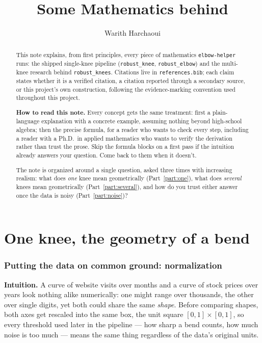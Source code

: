 \documentclass[11pt]{article}
\title{Some Mathematics behind \code{elbow-helper}}
\author{Warith Harchaoui}
\date{}
\newcommand{\code}[1]{\texttt{#1}}
\begin{document}
\maketitle

\begin{abstract}
This note explains, from first principles, every piece of mathematics
\code{elbow-helper} runs: the shipped single-knee pipeline
(\code{robust\_knee}, \code{robust\_elbow}) and the multi-knee research
behind \code{robust\_knees}. Citations live in \code{references.bib}; each
claim states whether it is a verified citation, a citation reported through
a secondary source, or this project's own construction, following the
evidence-marking convention used throughout this project.

\textbf{How to read this note.} Every concept gets the same treatment: first
a plain-language explanation with a concrete example, assuming nothing
beyond high-school algebra; then the precise formula, for a reader who wants
to check every step, including a reader with a Ph.D.\ in applied mathematics
who wants to verify the derivation rather than trust the prose. Skip the
formula blocks on a first pass if the intuition already answers your
question. Come back to them when it doesn't.

The note is organized around a single question, asked three times with
increasing realism: what does \emph{one} knee mean geometrically
(Part~\ref{part:one}), what does \emph{several} knees mean geometrically
(Part~\ref{part:several}), and how do you trust either answer once the data
is noisy (Part~\ref{part:noise})?
\end{abstract}

\tableofcontents

\part{One knee, the geometry of a bend}
\label{part:one}

\section{Putting the data on common ground: normalization}

\textbf{Intuition.} A curve of website visits over months and a curve of
stock prices over years look nothing alike numerically: one might range over
thousands, the other over single digits, yet both could share the same
\emph{shape}. Before comparing shapes, both axes get rescaled into the same
box, the unit square $[0,1] \times [0,1]$, so every threshold used later in
the pipeline --- how sharp a bend counts, how much noise is too much ---
means the same thing regardless of the data's original units.
\end{document}
